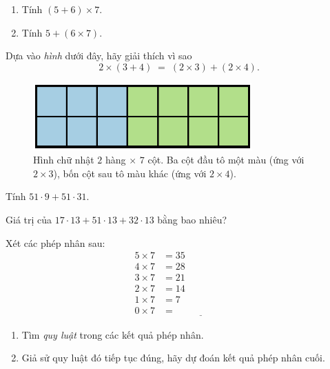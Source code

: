 \begin{problem}[1.11]
\begin{enumerate}[label=(\alph*)]
  \item Tính \((5+6)\times7\).
  \item Tính \(5+(6\times7)\).
\end{enumerate}
\end{problem}


\begin{problem}[1.12]
Dựa vào \emph{hình} dưới đây, hãy giải thích vì sao
\[
2\times(3+4) \;=\; (2\times3) + (2\times4).
\]

\begin{figure}[ht!]
  \centering
  \includegraphics[width=0.75\textwidth]{img/fig-prob1.12.pdf}
  \caption*{\small Hình chữ nhật \(2\) hàng \(\times\) \(7\) cột.
  Ba cột đầu tô một màu (ứng với \(2\times3\)),
  bốn cột sau tô màu khác (ứng với \(2\times4\)).}
\end{figure}
\end{problem}

\begin{problem}[1.13]
Tính \(51\cdot9 + 51\cdot31\).
\end{problem}

\begin{problem}[1.14]
Giá trị của \(17\cdot13 + 51\cdot13 + 32\cdot13\) bằng bao nhiêu?
\end{problem}

\begin{problem}[1.15]
Xét các phép nhân sau:
\[
\begin{aligned}
5\times 7 &= 35\\
4\times 7 &= 28\\
3\times 7 &= 21\\
2\times 7 &= 14\\
1\times 7 &= 7\\
0\times 7 &=\ \underline{\hspace{2cm}}
\end{aligned}
\]
\begin{enumerate}[label=(\alph*)]
  \item Tìm \emph{quy luật} trong các kết quả phép nhân.
  \item Giả sử quy luật đó tiếp tục đúng, hãy dự đoán kết quả phép nhân cuối.
\end{enumerate}
\end{problem}

